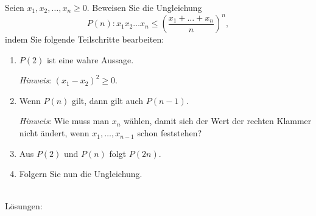 Seien $x_1, x_2, \ldots, x_n \geq 0$. Beweisen Sie
die Ungleichung
\[
P(n): x_1 x_2 \ldots x_n
\leq\left(\frac{x_1+\dots+x_n}{n}\right)^n,
\]
indem Sie folgende Teilschritte bearbeiten:
\begin{enumerate}
  \item $P(2)$ ist eine wahre Aussage.

     \emph{Hinweis}: $(x_1 - x_2)^2 \geq 0$.
  \item
     Wenn $P(n)$ gilt, dann gilt auch $P(n-1)$.

     \emph{Hinweis}: Wie muss man $x_n$ w\"ahlen, damit 
     sich der Wert der rechten Klammer nicht \"andert, wenn
     $x_1, \ldots, x_{n-1}$ schon feststehen?

   \item Aus $P(2)$ und $P(n)$ folgt $P(2n)$.
   \item Folgern Sie nun die Ungleichung. 
\end{enumerate}
\\
Lösungen: \\
